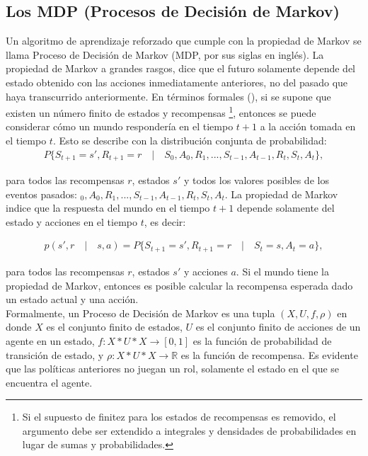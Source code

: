 \subsection{Los MDP (Procesos de Decisi\'on de Markov)}

Un algoritmo de aprendizaje reforzado que cumple con la propiedad de Markov se llama Proceso de Decisi\'on de Markov (MDP, por sus siglas en ingl\'es). La propiedad de Markov a grandes rasgos, dice que el futuro solamente depende del estado obtenido con las acciones inmediatamente anteriores, no del pasado que haya transcurrido anteriormente. En t\'erminos formales (\cite{Sutton}), si se supone que existen un n\'umero finito de estados y recompensas \footnote{Si el supuesto de finitez para los estados de recompensas es removido, el argumento debe ser extendido a integrales y densidades de probabilidades en lugar de sumas y probabilidades.}, entonces se puede considerar c\'omo un mundo responder\'ia en el tiempo $t+1$ a la acci\'on tomada en el tiempo $t$. Esto se describe con la distribuci\'on conjunta de probabilidad:\\

\vspace{-30pt}
\begin{align*}
P\{S_{t+1} = s', R_{t+1} = r \quad | \quad S_{0}, A_{0}, R_{1}, ... , S_{t-1}, A_{t-1}, R_{t}, S_{t}, A_{t} \},
\end{align*}

para todos las recompensas $r$, estados $s'$ y todos los valores posibles de los eventos pasados: $_{0}, A_{0}, R_{1}, ... , S_{t-1}, A_{t-1}, R_{t}, S_{t}, A_{t}$. La propiedad de Markov indice que la respuesta del mundo en el tiempo $t+1$ depende solamente del estado y acciones en el tiempo $t$, es decir:

\vspace{-30pt}
\begin{align*}
p\left(s', r \quad | \quad s,a \right) = P\{S_{t+1} = s', R_{t+1} = r \quad | \quad S_{t} = s, A_{t} =a\},
\end{align*}

para todos las recompensas $r$, estados $s'$ y acciones $a$. Si el mundo tiene la propiedad de Markov, entonces es posible calcular la recompensa esperada dado un estado actual y una acci\'on.\\

Formalmente, un Proceso de Decisi\'on de Markov es una tupla $(X,U,f,\rho)$ en donde $X$ es el conjunto finito de estados, $U$ es el conjunto finito de acciones de un agente en un estado, $f:X*U*X\rightarrow[0,1]$ es la funci\'on de probabilidad de transici\'on de estado, y $\rho:X*U*X\rightarrow\mathbb{R}$ es la funci\'on de recompensa. Es evidente que las pol\'iticas anteriores no juegan un rol, solamente el estado en el que se encuentra el agente.\\

